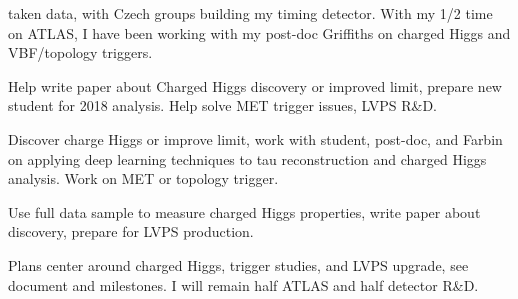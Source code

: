 taken data, with Czech groups building my timing detector.  With my 1/2 time on ATLAS, I have been working with my post-doc Griffiths on charged Higgs and VBF/topology triggers.

\vspace*{0.1in}
\begin{description}
\item[2017] Help write paper about Charged Higgs discovery or improved 
limit, prepare new student for 2018 analysis. Help solve MET trigger issues, LVPS R\&D.
\item[2018] Discover charge Higgs or improve limit,  work with student, post-doc, and Farbin on applying deep learning techniques to tau reconstruction and charged Higgs analysis. Work on MET or topology trigger.
\item[2019] Use full data sample to measure charged Higgs properties, write paper about discovery,  prepare for LVPS production. 
\end{description}
\vspace*{0.1in}
 Plans center around charged Higgs, trigger studies, and LVPS upgrade, see document and milestones.  I will remain half ATLAS and half detector R\&D. 

